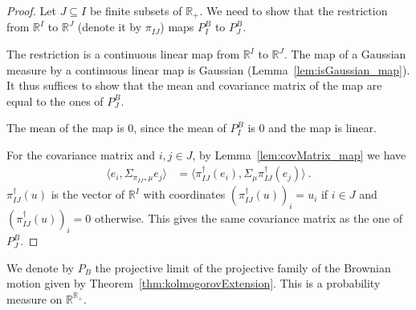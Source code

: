 \begin{proof}
Let $J \subseteq I$ be finite subsets of $\mathbb{R}_+$.
We need to show that the restriction from $\mathbb{R}^I$ to $\mathbb{R}^J$ (denote it by $\pi_{IJ}$) maps $P^B_I$ to $P^B_J$.

The restriction is a continuous linear map from $\mathbb{R}^I$ to $\mathbb{R}^J$.
The map of a Gaussian measure by a continuous linear map is Gaussian (Lemma~\ref{lem:isGaussian_map}).
It thus suffices to show that the mean and covariance matrix of the map are equal to the ones of $P^B_J$.

The mean of the map is $0$, since the mean of $P^B_I$ is $0$ and the map is linear.

For the covariance matrix and $i, j \in J$, by Lemma~\ref{lem:covMatrix_map} we have
\begin{align*}
  \langle e_i, \Sigma_{\pi_{IJ*}\mu} e_j\rangle
  &= \langle \pi_{IJ}^\dagger(e_i), \Sigma_\mu \pi_{IJ}^\dagger(e_j)\rangle
  \: .
\end{align*}
$\pi_{IJ}^\dagger(u)$ is the vector of $\mathbb{R}^I$ with coordinates $(\pi_{IJ}^\dagger(u))_i = u_i$ if $i \in J$ and $(\pi_{IJ}^\dagger(u))_i = 0$ otherwise.
This gives the same covariance matrix as the one of $P^B_J$.
\end{proof}


\begin{definition}\label{def:gaussianLimit}
We denote by $P_B$ the projective limit of the projective family of the Brownian motion given by Theorem~\ref{thm:kolmogorovExtension}.
This is a probability measure on $\mathbb{R}^{\mathbb{R}_+}$.
\end{definition}
